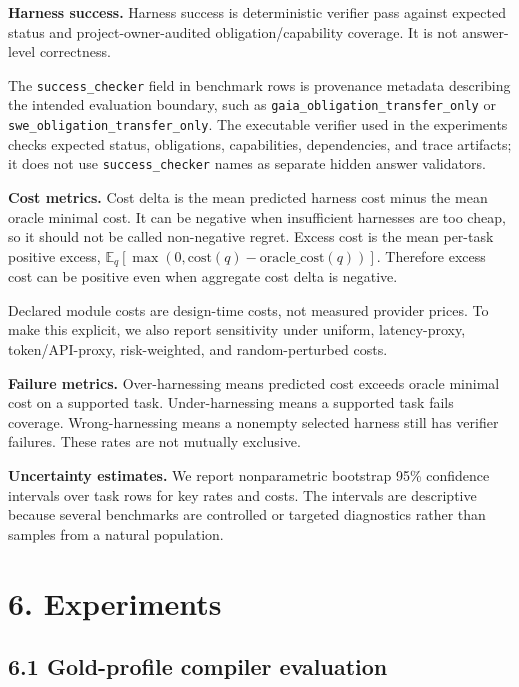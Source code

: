 \documentclass[
  10pt,
]{article}
\begin{document}
\textbf{Harness success.} Harness success is deterministic verifier pass
against expected status and project-owner-audited obligation/capability
coverage. It is not answer-level correctness.

The \texttt{success\_checker} field in benchmark rows is provenance
metadata describing the intended evaluation boundary, such as
\texttt{gaia\_obligation\_transfer\_only} or
\texttt{swe\_obligation\_transfer\_only}. The executable verifier used
in the experiments checks expected status, obligations, capabilities,
dependencies, and trace artifacts; it does not use
\texttt{success\_checker} names as separate hidden answer validators.

\textbf{Cost metrics.} Cost delta is the mean predicted harness cost
minus the mean oracle minimal cost. It can be negative when insufficient
harnesses are too cheap, so it should not be called non-negative regret.
Excess cost is the mean per-task positive excess,
\(\mathbb{E}_q[\max(0,\text{cost}(q)-\text{oracle\_cost}(q))]\).
Therefore excess cost can be positive even when aggregate cost delta is
negative.

Declared module costs are design-time costs, not measured provider
prices. To make this explicit, we also report sensitivity under uniform,
latency-proxy, token/API-proxy, risk-weighted, and random-perturbed
costs.

\textbf{Failure metrics.} Over-harnessing means predicted cost exceeds
oracle minimal cost on a supported task. Under-harnessing means a
supported task fails coverage. Wrong-harnessing means a nonempty
selected harness still has verifier failures. These rates are not
mutually exclusive.

\textbf{Uncertainty estimates.} We report nonparametric bootstrap 95\%
confidence intervals over task rows for key rates and costs. The
intervals are descriptive because several benchmarks are controlled or
targeted diagnostics rather than samples from a natural population.

\section{6. Experiments}\label{experiments}

\subsection{6.1 Gold-profile compiler
evaluation}\label{gold-profile-compiler-evaluation}
\end{document}
